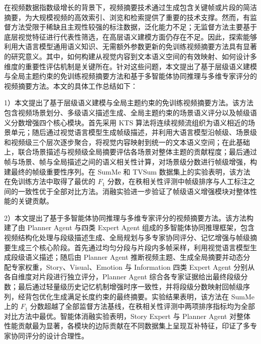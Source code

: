 


在视频数据指数级增长的背景下，视频摘要技术通过生成包含关键帧或片段的简洁摘要，为大规模视频的高效索引、浏览和检索提供了重要的技术支撑。然而，有监督方法受限于稀缺且主观性较强的标注数据，泛化能力不足；无监督方法主要基于底层视觉特征进行代表性筛选，在高层语义建模方面仍存在不足。因此，探索能够利用大语言模型通用语义知识、无需额外参数更新的免训练视频摘要方法具有显著的研究意义。其中，如何构建从视觉内容到文本语义空间的有效映射、如何设计多维度的重要性评估机制是关键所在。针对这些问题，本文提出了基于层级语义建模与全局主题约束的免训练视频摘要方法和基于多智能体协同推理与多维专家评分的视频摘要方法。本文的具体工作总结如下：

1）本文提出了基于层级语义建模与全局主题约束的免训练视频摘要方法。该方法包含视频场景划分、多级语义描述生成、全局主题约束的场景语义评分以及帧级语义分数增强四个核心模块。首先采用 KTS 算法将连续视频流组织为语义相近的场景单元；随后通过视觉语言模型生成帧级描述，并利用大语言模型沿帧级、场景级和视频级三个层次逐步聚合，将视觉内容映射到统一的文本语义空间；在此基础上，联合场景描述与视频级全局摘要评估各场景对整体主题的贡献程度；最后通过帧与场景、帧与全局描述之间的语义相关性计算，对场景级分数进行帧级增强，构建最终的帧级重要性序列。在 SumMe 和 TVSum 数据集上的实验表明，该方法在免训练方法中取得了最优的 $F_1$ 分数，在秩相关性评测中帧级排序与人工标注之间的一致性优于全部对比方法。消融实验进一步验证了帧级语义增强模块对整体性能的关键贡献。

2）本文提出了基于多智能体协同推理与多维专家评分的视频摘要方法。该方法构建了由 Planner Agent 与四类 Expert Agent 组成的多智能体协同推理框架，包含视频结构化处理与段级描述生成、全局规划与多专家协同评分、记忆增强与帧级摘要生成三个核心阶段。首先通过均匀分段与片段内多帧采样，利用视觉语言模型生成段级语义描述；随后由 Planner Agent 推断视频主题、生成全局摘要并动态分配专家权重，Story、Visual、Emotion 与 Information 四类 Expert Agent 分别从各自维度对片段进行独立评分，Planner Agent 综合各专家证据给出最终段级分数；最后通过轻量级历史记忆机制增强时序一致性，并将段级分数映射回帧级序列，经背包优化生成满足长度约束的最终摘要。实验结果表明，该方法在 SumMe 上的 $F_1$ 分数超越了全部监督方法基线，在秩相关性评测中两项排序指标均为全部对比方法中最优。智能体消融实验表明，Story Expert 与 Planner Agent 对整体性能贡献最为显著，各模块的边际贡献在不同数据集上呈现互补特征，印证了多专家协同评分的设计合理性。


